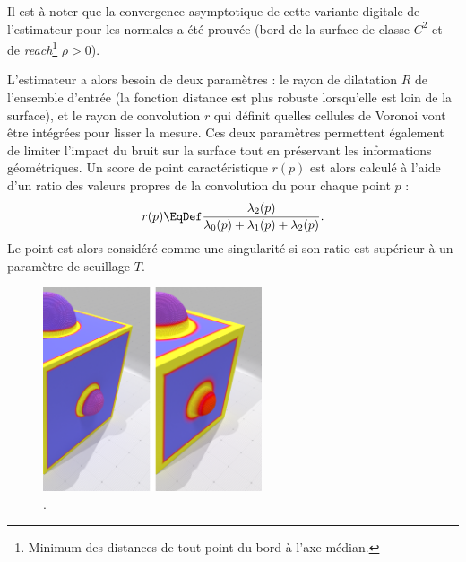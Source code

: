 Il est à noter que la convergence asymptotique de cette variante digitale de l'estimateur \VCM pour les normales a été prouvée (bord de la surface de classe $C^2$ et de \emph{reach}\footnote{Minimum des distances de tout point du bord à l'axe médian.} $\rho > 0$)\cite{Cuel2014DGCI}.

L'estimateur \VCM a alors besoin de deux paramètres : le rayon de dilatation $R$
de l'ensemble d'entrée (la fonction distance est plus robuste lorsqu'elle est
loin de la surface), et le rayon de convolution $r$ qui définit quelles cellules
de Voronoi vont être intégrées pour lisser la mesure. Ces deux paramètres
permettent également de limiter l'impact du bruit sur la surface tout en
préservant les informations géométriques. Un score de point caractéristique
$r(p)$ est alors calculé à l'aide d'un ratio des valeurs propres de la
convolution du \VCM pour chaque point $p$ :
\begin{equation}
  r(p) \EqDef \frac{\lambda_2(p)}{\lambda_0(p) + \lambda_1(p) + \lambda_2(p)}.
\end{equation}
Le point est alors considéré comme une singularité si son ratio est supérieur à un paramètre de seuillage $T$.

\begin{figure}[ht]{
  \begin{center}
    \includegraphics[height=6cm]{figures/CubeSpherePlotVCM}
  \end{center}}
    \caption[.]{.
    \label{fig:VCM-cubesphere}}
\end{figure}


